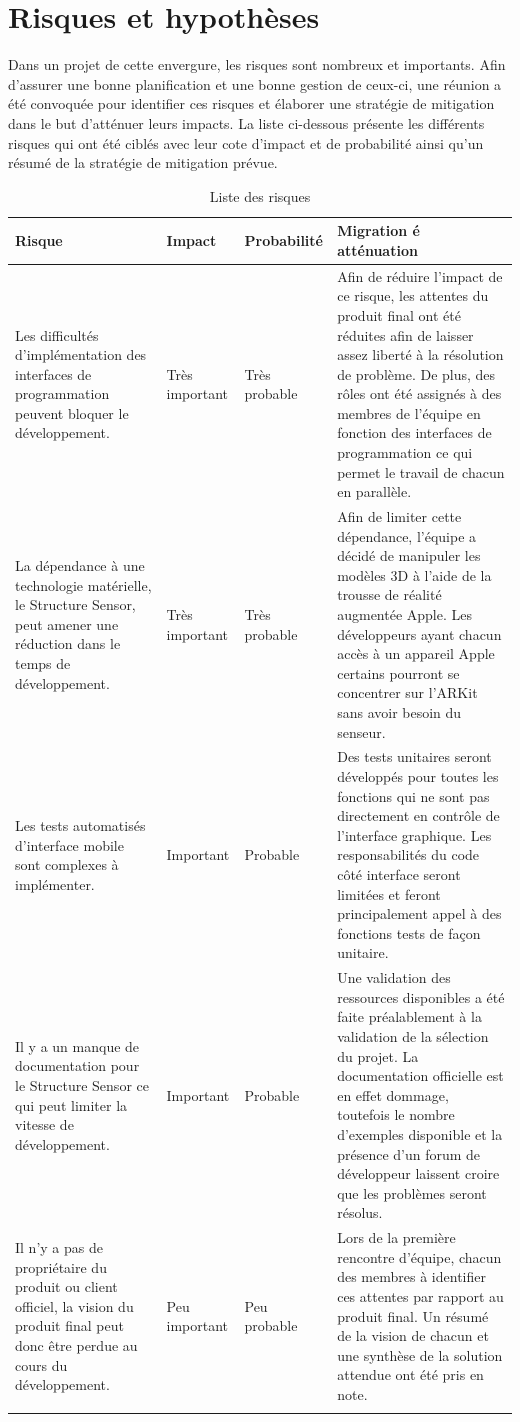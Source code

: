 \documentclass[rapport.tex]{subfiles}
\begin{document}
\section*{Risques et hypothèses}
Dans un projet de cette envergure, les risques sont nombreux et importants. Afin d’assurer une bonne planification et une bonne gestion de ceux-ci, une réunion a été convoquée pour identifier ces risques et élaborer une stratégie de mitigation dans le but d’atténuer leurs impacts. La liste ci-dessous présente les différents risques qui ont été ciblés avec leur cote d’impact et de probabilité ainsi qu’un résumé de la stratégie de mitigation prévue.
\begin{longtable}{|p{3.5cm}|p{2.75cm}|p{2.75cm}|p{6cm}|}\hline%
    Risque & Impact & Probabilité & Migration é atténuation \\\hline\hline
    Les difficultés d’implémentation des interfaces de programmation peuvent bloquer le développement. & Très important & Très probable & Afin de réduire l’impact de ce risque, les attentes du produit final ont été réduites afin de laisser assez liberté à la résolution de problème. De plus, des rôles ont été assignés à des membres de l’équipe en fonction des interfaces de programmation ce qui permet le travail de chacun en parallèle. \\\hline
    La dépendance à une technologie matérielle, le Structure Sensor, peut amener une réduction dans le temps de développement. & Très important & Très probable & Afin de limiter cette dépendance, l’équipe a décidé de manipuler les modèles 3D à l’aide de la trousse de réalité augmentée Apple. Les développeurs ayant chacun accès à un appareil Apple certains pourront se concentrer sur l'ARKit sans avoir besoin du senseur. \\\hline
    Les tests automatisés d’interface mobile sont complexes à implémenter. & Important & Probable & Des tests unitaires seront développés pour toutes les fonctions qui ne sont pas directement en contrôle de l’interface graphique. Les responsabilités du code côté interface seront limitées et feront principalement appel à des fonctions tests de façon unitaire. \\\hline
    Il y a un manque de documentation pour le Structure Sensor ce qui peut limiter la vitesse de développement. & Important & Probable & Une validation des ressources disponibles a été faite préalablement à la validation de la sélection du projet. La documentation officielle est en effet dommage, toutefois le nombre d’exemples disponible et la présence d’un forum de développeur laissent croire que les problèmes seront résolus. \\\hline
    Il n’y a pas de propriétaire du produit ou client officiel, la vision du produit final peut donc être perdue au cours du développement. & Peu important & Peu probable & Lors de la première rencontre d’équipe, chacun des membres à identifier ces attentes par rapport au produit final. Un résumé de la vision de chacun et une synthèse de la solution attendue ont été pris en note. \\\hline
    \caption{Liste des risques}
    \label{risquesPlanif}
\end{longtable}
\end{document}
